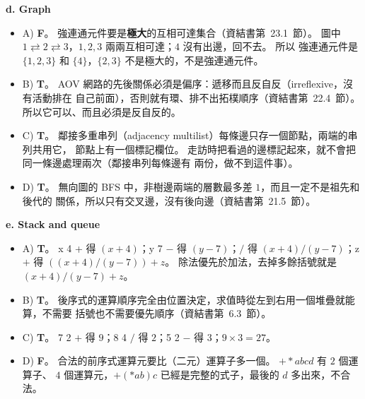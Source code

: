 \begin{pastsoln}
\textbf{d. Graph}
\begin{itemize}
\item A) \textbf{F}。 強連通元件要是\textbf{極大}的互相可達集合（資結書第~23.1~節）。 圖中
$1 \rightleftarrows 2 \rightleftarrows 3$，$1, 2, 3$ 兩兩互相可達；$4$ 沒有出邊，回不去。 所以
強連通元件是 $\{1, 2, 3\}$ 和 $\{4\}$，$\{2, 3\}$ 不是極大的，不是強連通元件。
\item B) \textbf{T}。 AOV 網路的先後關係必須是偏序：遞移而且反自反（irreflexive，沒有活動排在
自己前面），否則就有環、排不出拓樸順序（資結書第~22.4~節）。 所以它可以、而且必須是反自反的。
\item C) \textbf{T}。 鄰接多重串列（adjacency multilist）每條邊只存一個節點，兩端的串列共用它，
節點上有一個標記欄位。 走訪時把看過的邊標記起來，就不會把同一條邊處理兩次（鄰接串列每條邊有
兩份，做不到這件事）。
\item D) \textbf{T}。 無向圖的 BFS 中，非樹邊兩端的層數最多差 $1$，而且一定不是祖先和後代的
關係，所以只有交叉邊，沒有後向邊（資結書第~21.5~節）。
\end{itemize}

\textbf{e. Stack and queue}
\begin{itemize}
\item A) \textbf{T}。 x 4 + 得 $(x+4)$；y 7 $-$ 得 $(y-7)$；$/$ 得 $(x+4)/(y-7)$；z $+$ 得
$((x+4)/(y-7)) + z$。 除法優先於加法，去掉多餘括號就是 $(x+4)/(y-7)+z$。
\item B) \textbf{T}。 後序式的運算順序完全由位置決定，求值時從左到右用一個堆疊就能算，不需要
括號也不需要優先順序（資結書第~6.3~節）。
\item C) \textbf{T}。 7 2 $+$ 得 $9$；8 4 $/$ 得 $2$；5 2 $-$ 得 $3$；$9 \times 3 = 27$。
\item D) \textbf{F}。 合法的前序式運算元要比（二元）運算子多一個。 $+*abcd$ 有 $2$ 個運算子、
$4$ 個運算元，$+(*ab)c$ 已經是完整的式子，最後的 $d$ 多出來，不合法。
\end{itemize}
\end{pastsoln}
